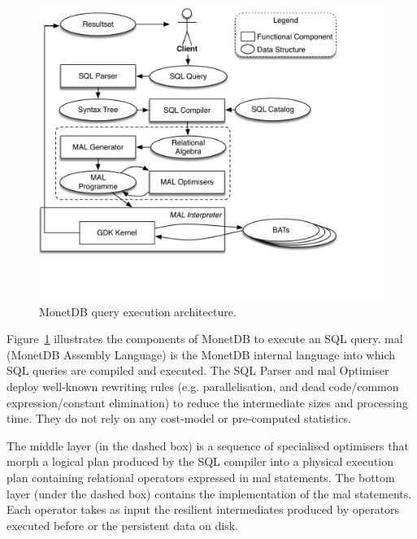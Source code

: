 \documentclass[conference]{IEEEtran}
\begin{document}
\begin{figure}[t]
    \centering\includegraphics[width=\columnwidth]{Figures/MDB_impl_arch.pdf}
    \caption{MonetDB query execution architecture.}
    \label{fig:mdb_arch}
\end{figure}

Figure~\ref{fig:mdb_arch} illustrates the components of MonetDB to execute an SQL query.
{\sc mal} (MonetDB Assembly Language) is the MonetDB internal language into which SQL queries are compiled and executed.
The SQL Parser and {\sc mal} Optimiser deploy well-known rewriting rules (e.g. parallelisation, and dead code/common expression/constant elimination) to reduce the intermediate sizes and processing time.
They do not rely on any cost-model or pre-computed statistics.

The middle layer (in the dashed box) is a sequence of specialised optimisers that morph a logical plan produced by the SQL compiler into a physical execution plan containing relational operators expressed in {\sc mal} statements.
The bottom layer (under the dashed box) contains the implementation of the {\sc mal} statements.
Each operator takes as input the resilient intermediates produced by operators executed before or the persistent data on disk.
\end{document}
